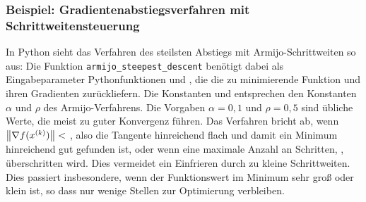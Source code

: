 \subsubsection{Beispiel: Gradientenabstiegsverfahren mit
  Schrittweitensteuerung}
\label{sec:armijosd}

In Python sieht das Verfahren des steilsten Abstiegs mit
Armijo-Schrittweiten so aus:
%
Die Funktion \lstinline!armijo_steepest_descent! benötigt dabei als
Eingabeparameter Pythonfunktionen  und , die die
zu minimierende Funktion und ihren Gradienten zurückliefern. Die
Konstanten  und  entsprechen den Konstanten
$\alpha$ und $\rho$ des Armijo-Verfahrens. Die Vorgaben $\alpha=0,1$
und $\rho=0,5$ sind übliche Werte, die meist zu guter Konvergenz
führen. Das Verfahren bricht ab, wenn $\left\lVert{\nabla f(x^{(k)})}\right\rVert<$
, also die Tangente hinreichend flach und damit ein Minimum
hinreichend gut gefunden ist, oder wenn eine maximale Anzahl an
Schritten, , überschritten wird. Dies vermeidet ein
Einfrieren durch zu kleine Schrittweiten. Dies passiert insbesondere,
wenn der Funktionswert im Minimum sehr groß oder klein ist, so dass
nur wenige Stellen zur Optimierung verbleiben.

